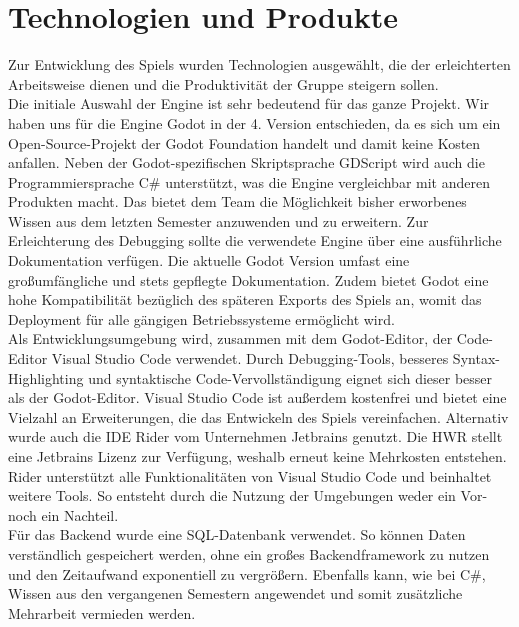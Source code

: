 \chapter{Technologien und Produkte}\label{ch:technologien}
Zur Entwicklung des Spiels wurden Technologien ausgewählt, die der erleichterten Arbeitsweise dienen
und die Produktivität der Gruppe steigern sollen. \\
\newline
Die initiale Auswahl der Engine ist sehr bedeutend für das ganze Projekt. 
Wir haben uns für die Engine Godot in der 4. Version entschieden, da es sich um ein Open-Source-Projekt der Godot 
Foundation handelt und damit keine Kosten anfallen.
Neben der Godot-spezifischen Skriptsprache GDScript wird auch die Programmiersprache C\# unterstützt, was die Engine vergleichbar mit anderen Produkten macht.
Das bietet dem Team die Möglichkeit bisher erworbenes Wissen aus dem 
letzten Semester anzuwenden und zu erweitern.
Zur Erleichterung des Debugging sollte die verwendete Engine über eine ausführliche Dokumentation verfügen. 
Die aktuelle Godot Version umfast eine großumfängliche und stets gepflegte Dokumentation.
Zudem bietet Godot eine hohe Kompatibilität bezüglich des späteren Exports des Spiels an, womit das 
Deployment für alle gängigen Betriebssysteme ermöglicht wird. \\
\newline
Als Entwicklungsumgebung wird, zusammen mit dem Godot-Editor, der Code-Editor Visual Studio Code verwendet. 
Durch Debugging-Tools, besseres Syntax-Highlighting und syntaktische Code-Vervollständigung eignet sich dieser besser als der Godot-Editor.
Visual Studio Code ist außerdem kostenfrei und bietet eine Vielzahl an Erweiterungen, die das Entwickeln des Spiels
vereinfachen.
Alternativ wurde auch die IDE Rider vom Unternehmen Jetbrains genutzt.
Die HWR stellt eine Jetbrains Lizenz zur Verfügung, weshalb erneut keine Mehrkosten entstehen.
Rider unterstützt alle Funktionalitäten von Visual Studio Code und beinhaltet weitere Tools. So entsteht durch die Nutzung der Umgebungen weder ein Vor- noch ein Nachteil.\\
\newline
Für das Backend wurde eine SQL-Datenbank verwendet.
So können Daten verständlich gespeichert werden, ohne ein großes Backendframework
zu nutzen und den Zeitaufwand exponentiell zu vergrößern. 
Ebenfalls kann, wie bei C\#, Wissen aus den vergangenen Semestern angewendet und somit zusätzliche 
Mehrarbeit vermieden werden. \\
